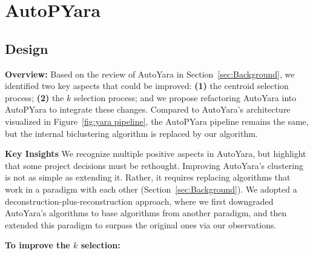 \section{AutoPYara}
\label{sec:Methodology}
\subsection{Design}

\noindent\textbf{Overview:} Based on the review of AutoYara in Section~\ref{sec:Background}, we identified two key aspects that could be improved: \textbf{(1)} the centroid selection process; \textbf{(2)} the $k$ selection process; and we propose refactoring AutoYara into AutoPYara to integrate these changes. Compared to AutoYara's architecture visualized in Figure~\ref{fig:yara pipeline}, the AutoPYara pipeline remains the same, but the internal biclustering algorithm is replaced by our algorithm.

\noindent \textbf{Key Insights} We recognize multiple positive aspects in AutoYara, but highlight that some project decisions must be rethought. Improving AutoYara's clustering is not as simple as extending it. Rather, it requires replacing algorithms that work in a paradigm with each other (Section~\ref{sec:Background}). We adopted a deconstruction-plus-reconstruction approach, where we first downgraded AutoYara's algorithms to base algorithms from another paradigm, and then extended this paradigm to surpass the original ones via our observations.

\noindent \textbf{To improve the $k$ selection:}

